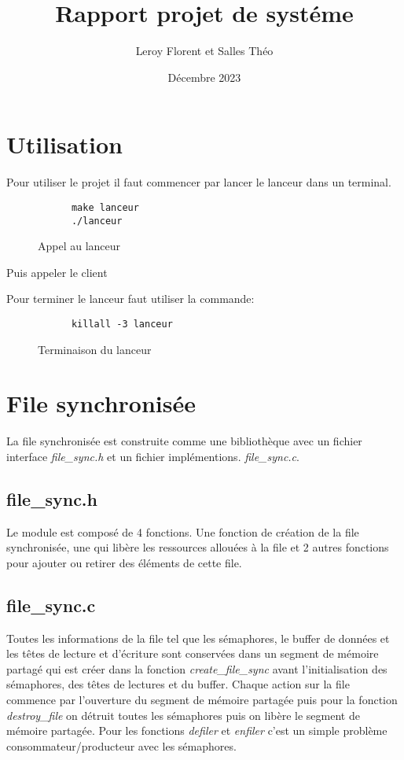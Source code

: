 \documentclass[12pt]{article}
\title{Rapport projet de systéme}
\author{Leroy Florent et Salles Théo}
\date{Décembre 2023}
\begin{document}
\maketitle
\tableofcontents
\newpage
\section{Utilisation}
Pour utiliser le projet il faut commencer par lancer le lanceur dans un
terminal.
\begin{figure}[H]
  \centering
  \begin{verbatim}
      make lanceur
      ./lanceur
  \end{verbatim}
  \caption{Appel au lanceur}
\end{figure}
Puis appeler le client

Pour terminer le lanceur faut utiliser la commande:
\begin{figure}[H]
  \centering
  \begin{verbatim}
      killall -3 lanceur
  \end{verbatim}
  \caption{Terminaison du lanceur}
\end{figure}
\section{File synchronisée}
La file synchronisée est construite comme une bibliothèque avec un fichier
interface \textit{file\_sync.h} et un fichier implémentions.
\textit{file\_sync.c}.
\subsection{file\_sync.h}
Le module est composé de 4 fonctions. Une fonction de création de la file
synchronisée, une qui libère les ressources allouées à la file et 2 autres
fonctions pour ajouter
ou retirer des éléments de cette file.
\subsection{file\_sync.c}
Toutes les informations de la file tel que les sémaphores, le buffer de données et les
têtes de lecture
et d'écriture sont conservées dans un segment de mémoire partagé qui est créer
dans la fonction \textit{create\_file\_sync} avant l'initialisation des
sémaphores,
des têtes de lectures et du buffer.
Chaque action sur la file commence par l'ouverture du segment de mémoire
partagée
puis pour la fonction \textit{destroy\_file} on détruit toutes les sémaphores
puis on libère le segment de mémoire partagée. Pour les fonctions
\textit{defiler} et \textit{enfiler}
c'est un simple problème consommateur/producteur avec les sémaphores.
\end{document}
